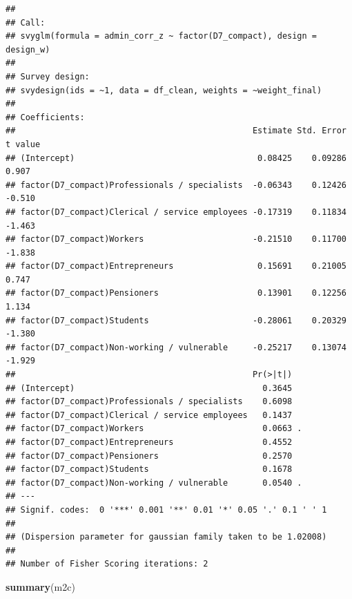 \documentclass[
]{article}
\newenvironment{Shaded}{\begin{snugshade}}{\end{snugshade}}
\newcommand{\FunctionTok}[1]{\textcolor[rgb]{0.13,0.29,0.53}{\textbf{#1}}}
\newcommand{\NormalTok}[1]{#1}
\begin{document}
\begin{verbatim}
## 
## Call:
## svyglm(formula = admin_corr_z ~ factor(D7_compact), design = design_w)
## 
## Survey design:
## svydesign(ids = ~1, data = df_clean, weights = ~weight_final)
## 
## Coefficients:
##                                                Estimate Std. Error t value
## (Intercept)                                     0.08425    0.09286   0.907
## factor(D7_compact)Professionals / specialists  -0.06343    0.12426  -0.510
## factor(D7_compact)Clerical / service employees -0.17319    0.11834  -1.463
## factor(D7_compact)Workers                      -0.21510    0.11700  -1.838
## factor(D7_compact)Entrepreneurs                 0.15691    0.21005   0.747
## factor(D7_compact)Pensioners                    0.13901    0.12256   1.134
## factor(D7_compact)Students                     -0.28061    0.20329  -1.380
## factor(D7_compact)Non-working / vulnerable     -0.25217    0.13074  -1.929
##                                                Pr(>|t|)  
## (Intercept)                                      0.3645  
## factor(D7_compact)Professionals / specialists    0.6098  
## factor(D7_compact)Clerical / service employees   0.1437  
## factor(D7_compact)Workers                        0.0663 .
## factor(D7_compact)Entrepreneurs                  0.4552  
## factor(D7_compact)Pensioners                     0.2570  
## factor(D7_compact)Students                       0.1678  
## factor(D7_compact)Non-working / vulnerable       0.0540 .
## ---
## Signif. codes:  0 '***' 0.001 '**' 0.01 '*' 0.05 '.' 0.1 ' ' 1
## 
## (Dispersion parameter for gaussian family taken to be 1.02008)
## 
## Number of Fisher Scoring iterations: 2
\end{verbatim}

\begin{Shaded}
\begin{Highlighting}[]
\FunctionTok{summary}\NormalTok{(m2c)}
\end{Highlighting}
\end{Shaded}
\end{document}
